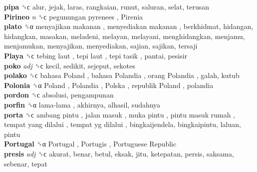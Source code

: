 \textbf{pipa} ␝ϲ  alur, jejak, laras, rangkaian, runut, saluran, selat, terusan  \\
\textbf{Pirineo} \emph{n}  ␝ϲ   pegunungan pyrenees ,  Pirenia   \\
\textbf{plato} ␝α   menyajikan makanan ,  menyediakan makanan , berkhidmat, hidangan, hidangkan, masakan, meladeni, melayan, melayani, menghidangkan, menjamu, menjamukan, menyajikan, menyediakan, sajian, sajikan, tersaji  \\
\textbf{Playa} ␝ϲ   tebing laut ,  tepi laut ,  tepi tasik , pantai, pesisir  \\
\textbf{poko} \emph{adj}  ␝ϲ  kecil, sedikit, sejeput, sekotes  \\
\textbf{polako} ␝ϲ   bahasa Poland ,  bahasa Polandia ,  orang Polandia , galah, kutub  \\
\textbf{Polonia} ␝α   Poland ,  Polandia ,  Polska ,  republik Poland , polandia  \\
\textbf{pordon} ␝ϲ  absolusi, pengampunan  \\
\textbf{porfin} ␝α   lama-lama , akhirnya, alhasil, sudahnya  \\
\textbf{porta} ␝ϲ   ambang pintu ,  jalan masuk ,  muka pintu ,  pintu masuk rumah ,  tempat yang dilalui ,  tempat yg dilalui , bingkaijendela, bingkaipintu, laluan, pintu  \\
\textbf{Portugal} ␝α   Portugal ,  Portugis ,  Portuguese Republic   \\
\textbf{presis} \emph{adj}  ␝ϲ  akurat, benar, betul, eksak, jitu, ketepatan, persis, saksama, sebenar, tepat  \\
